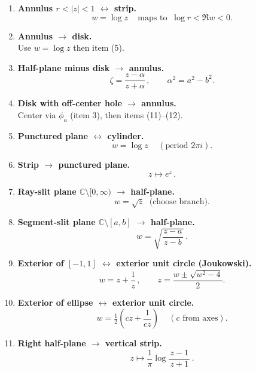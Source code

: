 \documentclass[11pt]{article}
\begin{document}
\begin{enumerate}
	\item \textbf{Annulus $r<|z|<1$ $\leftrightarrow$ strip.}\\[2pt]
	\[
	\boxed{\,w=\log z\,}\quad\text{maps to }\ \log r<\Re w<0.
	\]
	
	\item \textbf{Annulus $\to$ disk.}\\[2pt]
	Use $w=\log z$ then item (5).
	
	\item \textbf{Half-plane minus disk $\to$ annulus.}\\[2pt]
	\[
	\boxed{\,\zeta=\frac{z-\alpha}{z+\alpha}\,},\qquad \alpha^{2}=a^{2}-b^{2}.
	\]
	
	\item \textbf{Disk with off-center hole $\to$ annulus.}\\[2pt]
	Center via $\phi_a$ (item 3), then items (11)–(12).
	
	\item \textbf{Punctured plane $\leftrightarrow$ cylinder.}\\[2pt]
	\[
	\boxed{\,w=\log z\,}\quad(\text{period }2\pi i).
	\]
	
	\item \textbf{Strip $\to$ punctured plane.}\\[2pt]
	\[
	\boxed{\,z\mapsto e^{z}\,}.
	\]
	
	\item \textbf{Ray-slit plane $\mathbb C\setminus[0,\infty)$ $\to$ half-plane.}\\[2pt]
	\[
	\boxed{\,w=\sqrt{z}\,}\ \ \text{(choose branch)}.
	\]
	
	\item \textbf{Segment-slit plane $\mathbb C\setminus[a,b]$ $\to$ half-plane.}\\[2pt]
	\[
	\boxed{\,w=\sqrt{\frac{z-a}{\,z-b\,}}\,}.
	\]
	
	\item \textbf{Exterior of $[-1,1]$ $\leftrightarrow$ exterior unit circle (Joukowski).}\\[2pt]
	\[
	\boxed{\,w=z+\frac{1}{z}\,},\qquad
	z=\frac{w\pm\sqrt{w^{2}-4}}{2}.
	\]
	
	\item \textbf{Exterior of ellipse $\leftrightarrow$ exterior unit circle.}\\[2pt]
	\[
	\boxed{\,w=\tfrac12\!\left(c z+\frac{1}{c z}\right)\,}\quad(\text{$c$ from axes}).
	\]
	
	\item \textbf{Right half-plane $\to$ vertical strip.}\\[2pt]
	\[
	\boxed{\,z\mapsto \frac{1}{\pi}\log\frac{z-1}{\,z+1\,}\,}.
	\]
	

\end{enumerate}
\end{document}
